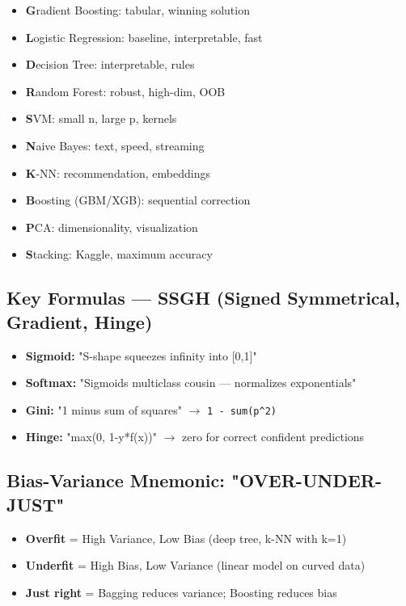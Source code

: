 \documentclass[11pt]{article}
\providecommand{\tightlist}{\setlength{\itemsep}{1pt}\setlength{\parskip}{0pt}}
\begin{document}
\begin{itemize}
\tightlist
\item
  \textbf{G}radient Boosting: tabular, winning solution
\item
  \textbf{L}ogistic Regression: baseline, interpretable, fast
\item
  \textbf{D}ecision Tree: interpretable, rules
\item
  \textbf{R}andom Forest: robust, high-dim, OOB
\item
  \textbf{S}VM: small n, large p, kernels
\item
  \textbf{N}aive Bayes: text, speed, streaming
\item
  \textbf{K}-NN: recommendation, embeddings
\item
  \textbf{B}oosting (GBM/XGB): sequential correction
\item
  \textbf{P}CA: dimensionality, visualization
\item
  \textbf{S}tacking: Kaggle, maximum accuracy
\end{itemize}

\subsection{Key Formulas --- SSGH (Signed Symmetrical, Gradient, Hinge)}\label{key-formulas--ssgh-signed-symmetrical-gradient-hinge}

\begin{itemize}
\tightlist
\item
  \textbf{Sigmoid:} "S-shape squeezes infinity into {[}0,1{]}"
\item
  \textbf{Softmax:} "Sigmoid\textquotesingle s multiclass cousin --- normalizes exponentials"
\item
  \textbf{Gini:} "1 minus sum of squares" \(\rightarrow\) \texttt{1\ -\ sum(p\^{}2)}
\item
  \textbf{Hinge:} "max(0, 1-y*f(x))" \(\rightarrow\) zero for correct confident predictions
\end{itemize}

\subsection{Bias-Variance Mnemonic: "OVER-UNDER-JUST"}\label{bias-variance-mnemonic-over-under-just}

\begin{itemize}
\tightlist
\item
  \textbf{Overfit} = High Variance, Low Bias (deep tree, k-NN with k=1)
\item
  \textbf{Underfit} = High Bias, Low Variance (linear model on curved data)
\item
  \textbf{Just right} = Bagging reduces variance; Boosting reduces bias
\end{itemize}
\end{document}

